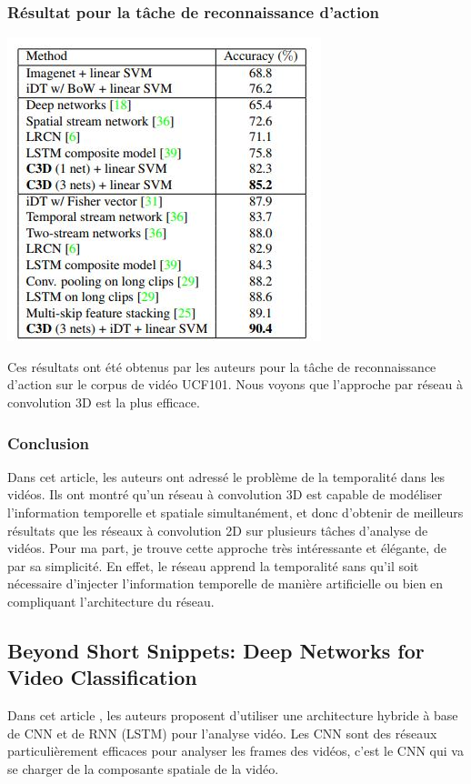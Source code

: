 \documentclass[11pt]{article}
\begin{document}
\subsubsection{Résultat pour la tâche de reconnaissance d'action}
\label{sec:org9a1f928}
\begin{center}
\includegraphics[width=.9\linewidth]{c3d_result.jpg}
\end{center}
Ces résultats ont été obtenus par les auteurs pour la tâche de reconnaissance d'action sur le corpus de vidéo UCF101.
Nous voyons que l'approche par réseau à convolution 3D est la plus efficace.

\subsubsection{Conclusion}
\label{sec:orgb9605f9}
Dans cet article, les auteurs ont adressé le problème de la temporalité dans les vidéos.
Ils ont montré qu'un réseau à convolution 3D est capable de modéliser l'information temporelle et spatiale simultanément, et donc d'obtenir de meilleurs résultats que les réseaux à convolution 2D sur plusieurs tâches d'analyse de vidéos.
Pour ma part, je trouve cette approche très intéressante et élégante, de par sa simplicité.
En effet, le réseau apprend la temporalité sans qu'il soit nécessaire d'injecter l'information temporelle de manière artificielle ou bien en compliquant l'architecture du réseau.

\subsection{Beyond Short Snippets: Deep Networks for Video Classification}
\label{sec:orgf550b49}
Dans cet article \cite{Joe_Yue_Hei_Ng_2015}, les auteurs proposent d'utiliser une architecture hybride à base de CNN et de RNN (LSTM) pour l'analyse vidéo.
Les CNN sont des réseaux particulièrement efficaces pour analyser les frames des vidéos, c'est le CNN qui va se charger de la composante spatiale de la vidéo.
\end{document}
